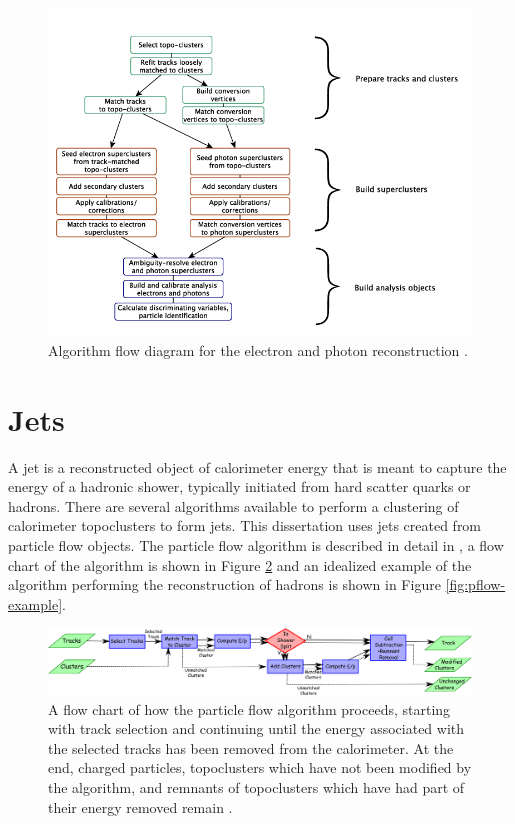 	\begin{figure}[!ht]
	\centering
	\includegraphics[width=.65\textwidth,keepaspectratio=true]{chapters/chapter5_eventreconnstruction/images/egamma_flow_01.png}
	\caption{\label{fig:egamma-reco} Algorithm flow diagram for the electron and photon reconstruction \cite{electron-perf}.}
	\end{figure}

	\section{Jets}\label{sec:reco-jets}
	A jet is a reconstructed object of calorimeter energy that is meant to capture the energy of a hadronic shower, typically initiated from hard scatter quarks or hadrons. There are several algorithms available to perform a clustering of calorimeter topoclusters to form jets. This dissertation uses jets created from particle flow objects. The particle flow algorithm is described in detail in \cite{pflow}, a flow chart of the algorithm is shown in Figure \ref{fig:pflow-flowchart} and an idealized example of the algorithm performing the reconstruction of hadrons is shown in Figure \ref{fig:pflow-example}. 

	\begin{figure}[!ht]
	\centering
	\includegraphics[width=\textwidth,keepaspectratio=true]{chapters/chapter5_eventreconnstruction/images/pflow_flow_chart.png}
	\caption{\label{fig:pflow-flowchart} A flow chart of how the particle flow algorithm proceeds, starting with track selection and continuing until the energy associated with the selected tracks has been removed from the calorimeter. At the end, charged particles, topoclusters which have not been modified by the algorithm, and remnants of topoclusters which have had part of their energy removed remain \cite{pflow}.}
	\end{figure}

